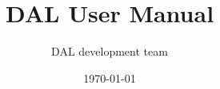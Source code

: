 \documentclass[a4paper,fontsize=10pt]{scrartcl}
\begin{document}
\pagestyle{fancy}
\renewcommand{\footrulewidth}{0.4pt}
\fancyfoot[C]{}
\fancyfoot[R]{\thepage}

\title{DAL User Manual}
\author{DAL development team}
\date{\today}
\maketitle{}

\tableofcontents
\end{document}
